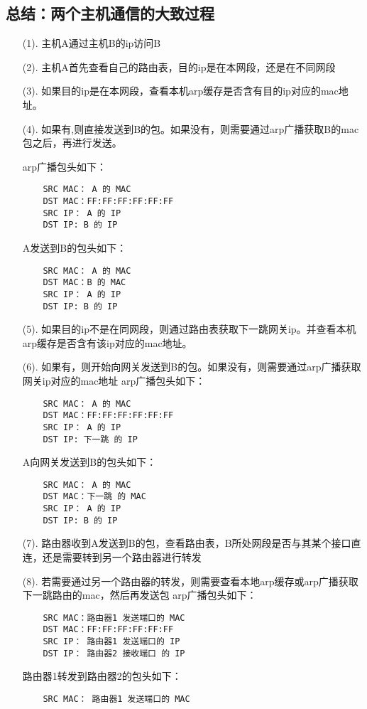 \documentclass[a4paper,left=1.5cm,right=1.5cm,11pt]{article}
\begin{document}
\subsection{总结：两个主机通信的大致过程}
\begin{itemize}
	\item[(1).]主机A通过主机B的ip访问B
	\item[(2).]主机A首先查看自己的路由表，目的ip是在本网段，还是在不同网段
	\item[(3).]如果目的ip是在本网段，查看本机arp缓存是否含有目的ip对应的mac地址。
	\item[(4).]如果有,则直接发送到B的包。如果没有，则需要通过arp广播获取B的mac包之后，再进行发送。\par
	arp广播包头如下：
	\begin{lstlisting}
	SRC MAC： A 的 MAC
	DST MAC：FF:FF:FF:FF:FF:FF
	SRC IP： A 的 IP
	DST IP: B 的 IP
	\end{lstlisting}
	A发送到B的包头如下：
	\begin{lstlisting}
	SRC MAC： A 的 MAC
	DST MAC：B 的 MAC
	SRC IP： A 的 IP
	DST IP: B 的 IP
	\end{lstlisting}
	\item[(5).]如果目的ip不是在同网段，则通过路由表获取下一跳网关ip。并查看本机arp缓存是否含有该ip对应的mac地址。
	\item[(6).]如果有，则开始向网关发送到B的包。如果没有，则需要通过arp广播获取网关ip对应的mac地址
	arp广播包头如下：
	\begin{lstlisting}
	SRC MAC： A 的 MAC
	DST MAC：FF:FF:FF:FF:FF:FF
	SRC IP： A 的 IP
	DST IP: 下一跳 的 IP
	\end{lstlisting}
	A向网关发送到B的包头如下：
	\begin{lstlisting}
	SRC MAC： A 的 MAC
	DST MAC：下一跳 的 MAC
	SRC IP： A 的 IP
	DST IP: B 的 IP
	\end{lstlisting}
	\item[(7).]路由器收到A发送到B的包，查看路由表，B所处网段是否与其某个接口直连，还是需要转到另一个路由器进行转发
	\item[(8).]若需要通过另一个路由器的转发，则需要查看本地arp缓存或arp广播获取下一跳路由的mac，然后再发送包
	arp广播包头如下：
	\begin{lstlisting}
	SRC MAC：路由器1 发送端口的 MAC
	DST MAC：FF:FF:FF:FF:FF:FF
	SRC IP： 路由器1 发送端口的 IP
	DST IP： 路由器2 接收端口 的 IP
	\end{lstlisting}
	路由器1转发到路由器2的包头如下：
	\begin{lstlisting}
	SRC MAC： 路由器1 发送端口的 MAC

\end{lstlisting}
\end{itemize}
\end{document}
